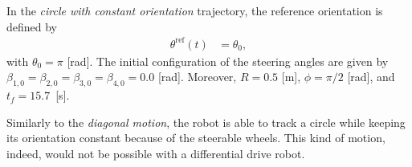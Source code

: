 In the \textit{circle with constant orientation} trajectory, the reference orientation is defined by
\begin{subequations}
\begin{align*}
    \theta^{\mathrm{ref}}(t) &= \theta_0,
\end{align*}
\end{subequations}
with $\theta_0=\pi$ [rad]. The initial configuration of the steering angles are given by$\beta_{1,0}=\beta_{2,0}=\beta_{3,0}=\beta_{4,0}=0.0$ [rad]. Moreover, $R=0.5$ [m], $\phi=\pi/2$ [rad], and $t_f=15.7$~[s].

Similarly to the \textit{diagonal motion}, the robot is able to track a circle while keeping its orientation constant because of the steerable wheels. This kind of motion, indeed, would not be possible with a differential drive robot.

